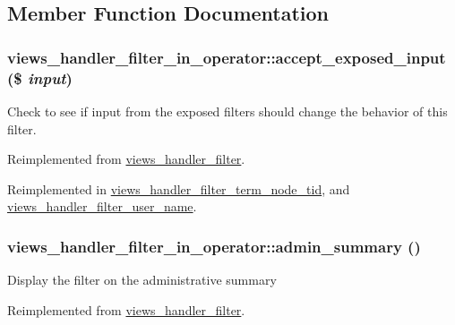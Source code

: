 \subsection{Member Function Documentation}
\hypertarget{classviews__handler__filter__in__operator_aff2b25941729b9ca81e1e53bb8e95a96}{
\subsubsection[{accept\_\-exposed\_\-input}]{\setlength{\rightskip}{0pt plus 5cm}views\_\-handler\_\-filter\_\-in\_\-operator::accept\_\-exposed\_\-input (\$ {\em input})}}
\label{classviews__handler__filter__in__operator_aff2b25941729b9ca81e1e53bb8e95a96}
Check to see if input from the exposed filters should change the behavior of this filter. 

Reimplemented from \hyperlink{classviews__handler__filter_a88ccd2ef359009614abb48fb83c2a738}{views\_\-handler\_\-filter}.

Reimplemented in \hyperlink{classviews__handler__filter__term__node__tid_a75f38674ff356981f6e77f009da2101a}{views\_\-handler\_\-filter\_\-term\_\-node\_\-tid}, and \hyperlink{classviews__handler__filter__user__name_aa6ae18031b13da1c92d83b8c5de74c15}{views\_\-handler\_\-filter\_\-user\_\-name}.\hypertarget{classviews__handler__filter__in__operator_a2c17bde9b5cb3498d31786ba888d545c}{
\subsubsection[{admin\_\-summary}]{\setlength{\rightskip}{0pt plus 5cm}views\_\-handler\_\-filter\_\-in\_\-operator::admin\_\-summary ()}}
\label{classviews__handler__filter__in__operator_a2c17bde9b5cb3498d31786ba888d545c}
Display the filter on the administrative summary 

Reimplemented from \hyperlink{classviews__handler__filter_a655263cd0b73188eec064b9a9743fe4c}{views\_\-handler\_\-filter}.

